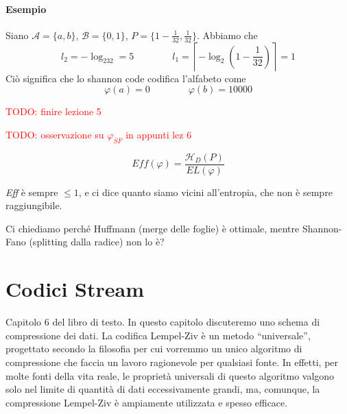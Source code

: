 \paragraph{Esempio} Siano $\mathcal{A}=\{a,b\}$, $\mathcal{B}=\{0,1\}$, $P=\{1-\frac{1}{32},\frac{1}{32}\}$. Abbiamo che
$$
    l_2 = -\log_232 = 5 \qquad\qquad l_1 = \left\lceil -\log_2\left(1-\frac{1}{32}\right)\right\rceil = 1
$$
Ciò significa che lo shannon code codifica l'alfabeto come
$$
    \varphi(a) = 0 \qquad\qquad \varphi(b) = 10000
$$
\begin{center}
\end{center}



\textcolor{Red}{TODO: finire lezione 5}

\textcolor{Red}{TODO: osservazione su $\varphi_{SF}$ in appunti lez 6}


\begin{definition}
    $$
        Eff(\varphi) = \frac{\mathcal{H}_D(P)}{EL(\varphi)}
    $$
\end{definition}
\emph{Eff} è sempre $\leq 1$, e ci dice quanto siamo vicini all'entropia, che non è sempre raggiungibile.\medskip

Ci chiediamo perché Huffmann (merge delle foglie) è ottimale, mentre Shannon-Fano (splitting dalla radice) non lo è?


\section{Codici Stream}
Capitolo 6 del libro di testo. In questo capitolo discuteremo uno schema di compressione dei dati. La codifica Lempel-Ziv è un metodo ``universale'', progettato secondo la filosofia per cui vorremmo un unico algoritmo di compressione che faccia un lavoro ragionevole per qualsiasi fonte. In effetti, per molte fonti della vita reale, le proprietà universali di questo algoritmo valgono solo nel limite di quantità di dati eccessivamente grandi, ma, comunque, la compressione Lempel-Ziv è ampiamente utilizzata e spesso efficace.


